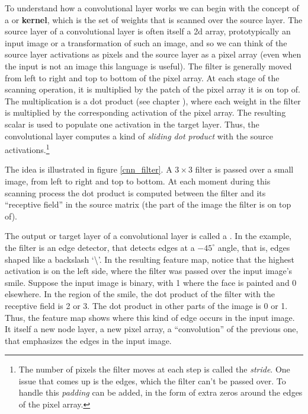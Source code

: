 To understand how a convolutional  layer works we can begin with the concept of a  or \textbf{kernel}, which is the set of weights that is scanned over the source layer. The source layer of a convolutional layer is often itself a 2d array, prototypically an input image or a transformation of such an image, and so we can think of the source layer activations as pixels and the source layer as a pixel array (even when the input is not an image this language is useful).  The filter is generally moved from left to right and top to bottom of the pixel array. At each stage of the scanning operation, it is multiplied by the patch of the pixel array it is on top of. The multiplication is a dot product (see chapter ),  where each weight in the filter is multiplied by the corresponding activation of the pixel array. The resulting scalar is used to populate one activation in the target layer. Thus, the convolutional layer computes a kind of \emph{sliding dot product} with the source activations.\footnote{The number of pixels the filter moves at each step is called the \emph{stride}. One issue that comes up is the edges, which the filter can't be passed over. To handle this \emph{padding} can be added, in the form of extra zeros around the edges of the pixel array.}

The idea is illustrated in figure \ref{cnn_filter}. A $3 \times 3$ filter is passed over a small image, from left to right and top to bottom. At each moment during this scanning process the dot product is computed between the filter and its ``receptive field'' in the source matrix (the part of the image the filter is on top of). 

The output or target layer of a convolutional layer is called a . In the example, the filter is an edge detector, that detects edges at a $-45^\circ$ angle, that is, edges shaped like a backslash `\textbackslash'. In the resulting feature map, notice that the highest activation is on the left side, where the filter was passed over the input image's smile. Suppose the input image is binary, with 1 where the face is painted and 0 elsewhere. In the region of the smile, the dot product of the filter with the receptive field is 2 or 3. The dot product in other parts of the image is 0 or 1. Thus, the feature map shows where this kind of edge occurs in the input image. It itself a new node layer, a new pixel array, a ``convolution'' of the previous one, that emphasizes the edges in the input image.


